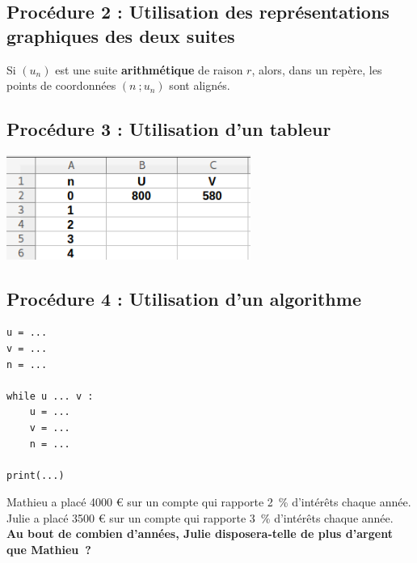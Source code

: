 \documentclass[a4paper,11pt,cours]{nsi} %
\begin{document}
\subsection*{Procédure 2 : Utilisation des représentations graphiques des deux suites}
\begin{propriete}[ ]
	Si $(u_n)$ est une suite \textbf{arithmétique} de raison $r$, alors, dans un repère, les points de coordonnées $(n\ ;u_n)$ sont alignés.
\end{propriete}



\begin{multicols}{2}
	\subsection*{Procédure 3 : Utilisation d'un tableur}
	\includegraphics[width=8cm]{tableur1}\\
	
	\vspace{3cm}
	
	\subsection*{Procédure 4 : Utilisation d'un algorithme}
	\begin{pyc}
        \begin{verbatim}
u = ...
v = ...
n = ...

while u ... v :
    u = ...
    v = ...
    n = ...

print(...)
        \end{verbatim}
    \end{pyc}
\end{multicols}

\vspace{.5cm}

\begin{exercice}[ ]
	Mathieu a placé 4000 € sur un compte qui rapporte 2 \% d’intérêts chaque année.\\ Julie a placé 3500 € sur un compte qui rapporte 3 \% d’intérêts chaque année.\\[.5em]
	\textbf{Au bout de combien d’années, Julie disposera-telle de plus d’argent que Mathieu ?}
\end{exercice}
\end{document}
